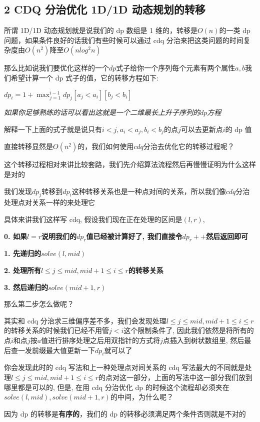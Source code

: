 \hr

\subsection{2 CDQ 分治优化 1D/1D 动态规划的转移}

所谓 1D/1D 动态规划就是说我们的 dp 数组是 1 维的，转移是$O(n)$的一类 dp 问题，如果条件良好的话我们有些时候可以通过 cdq 分治来把这类问题的时间复杂度由$O(n^2)$降至$O(nlog^2n)$

那么比如说我们要优化这样的一个$dp$式子给你一个序列每个元素有两个属性$a,b$我们希望计算一个 dp 式子的值，它的转移方程如下:

$dp_{i}=1+ \max_{j=1}^{i-1}dp_{j}[a_{j}<a_{i}][b_{j}<b_{i}]$

{\em 如果你足够熟练的话可以看出这就是一个二维最长上升子序列的$dp$方程 }

解释一下上面的式子就是说只有$i<j,a_{i}<a_{j},b_{i}<b_{j}$的点$j$可以去更新点$i$的 dp 值

直接转移显然是$O(n^2)$的，我们如何使用$cdq$分治去优化它的转移过程呢？

这个转移过程相对来讲比较套路，我们先介绍算法流程然后再慢慢证明为什么这样是对的

我们发现$dp_{j}$转移到$dp_{i}$这种转移关系也是一种点对间的关系，所以我们像$cdq$分治处理点对关系一样的来处理它

具体来讲我们这样写 cdq, 假设我们现在正在处理的区间是$(l,r)$,

\textbf{0. 如果$l=r$说明我们的$dp_{r}$值已经被计算好了, 我们直接令$dp_{r}++$然后返回即可}

\textbf{1. 先递归的$solve(l,mid)$}

\textbf{2. 处理所有$l \leq j \leq mid,mid+1 \leq i \leq r$的转移关系}

\textbf{3. 然后递归的$solve(mid+1,r)$}

那么第二步怎么做呢？

其实和 cdq 分治求三维偏序差不多，我们会发现处理$l \leq j \leq mid,mid+1 \leq i \leq r$的转移关系的时候我们已经不用管$j<i$这个限制条件了, 因此我们依然是将所有的点$i$和点$j$按$a$值进行排序处理之后用双指针的方式将$j$点插入到树状数组里, 然后最后查一发前缀最大值更新一下$dp_{i}$就可以了

你会发现此时的 cdq 写法和上一种处理点对间关系的 cdq 写法最大的不同就是处理$l \leq j \leq mid,mid+1 \leq i \leq r$的点对这一部分，上面的写法中这一部分我们放到哪里都是可以的, 但是, 在用 cdq 分治优化 dp 的时候这个流程却必须夹在$solve(l,mid),solve(mid+1,r)$的中间，为什么呢？

因为 dp 的转移是\textbf{有序的}，我们的 dp 的转移必须满足两个条件否则就是不对的

